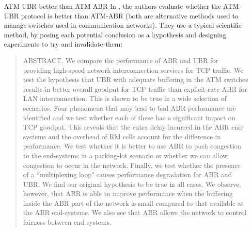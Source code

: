  \begin{ex}{ATM UBR better than ATM ABR}
 In \cite{402/LCA}, the authors evaluate whether the ATM-UBR protocol is better than ATM-ABR (both are alternative
 methods used to manage switches used in communication networks).
 They use a typical scientific method, by posing each potential
 conclusion as a hypothesis and designing experiments to try and
 invalidate them:
 \begin{quote}
 ABSTRACT. We compare the performance of ABR and UBR for providing high-speed network interconnection
services for TCP traffic. We test the hypothesis
that UBR with adequate buffering in the ATM
switches results in better overall goodput for
TCP traffic than explicit rate ABR for LAN
interconnection. This is shown to be true in a
wide selection of scenarios. Four phenomena that
may lead to bad ABR performance are identified
and we test whether each of these has a
significant impact on TCP goodput. This reveals
that the extra delay incurred in the ABR
end-systems and the overhead of RM cells account
for the difference in performance. We test
whether it is better to use ABR to push
congestion to the end-systems in a parking-lot
scenario or whether we can allow congestion to
occur in the network. Finally, we test whether
the presence of a ``multiplexing loop" causes
performance degradation for ABR and UBR. We find
our original hypothesis to be true in all cases.
We observe, however, that ABR is able to improve
performance when the buffering inside the ABR
part of the network is small compared to that
available at the ABR end-systems. We also see
that ABR allows the network to control fairness
between end-systems.
 \end{quote}
 \end{ex}


